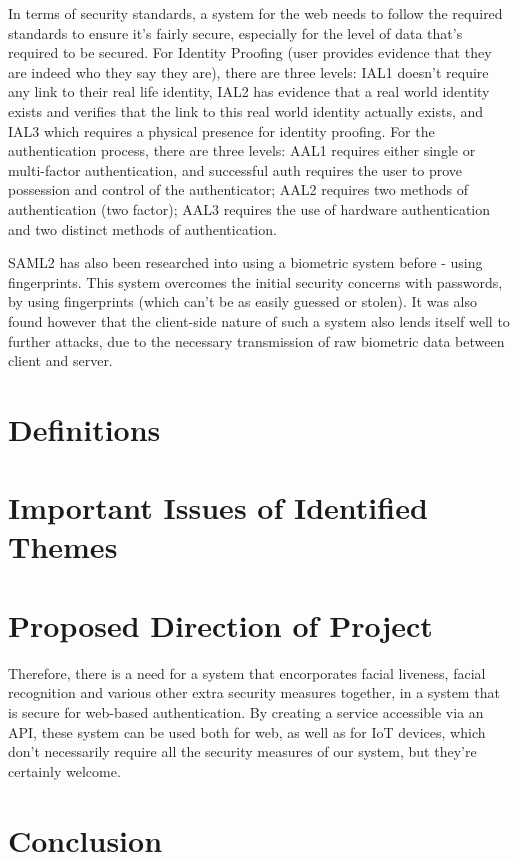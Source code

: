 \documentclass[14pt]{article}
\begin{document}
In terms of security standards, a system for the web needs to follow the required standards to ensure it's fairly secure,
especially for the level of data that's required to be secured. For Identity Proofing (user provides evidence that they are indeed who they say they are),
there are three levels: IAL1 doesn't require any link to their real life identity, IAL2 has evidence that a real world identity exists and verifies that the link to this real world identity actually exists,
and IAL3 which requires a physical presence for identity proofing. For the authentication process, there are three levels: AAL1 requires either single or multi-factor authentication, and successful auth requires
the user to prove possession and control of the authenticator; AAL2 requires two methods of authentication (two factor); AAL3 requires the use of hardware authentication and two distinct methods of authentication.
\cite{NISTDigitalIdentityGuidelines}


SAML2 has also been researched into using a biometric system before - using fingerprints. This system
overcomes the initial security concerns with passwords, by using fingerprints (which can't be as easily guessed or
stolen). It was also found however that the client-side nature of such a system also lends itself well to further attacks,
due to the necessary transmission of raw biometric data between client and server. \cite{SAMLFingerPrint}
\section{Definitions}


\section{Important Issues of Identified Themes}



\section{Proposed Direction of Project}
Therefore, there is a need for a system that encorporates facial liveness, facial recognition and various other
extra security measures together, in a system that is secure for web-based authentication. By creating a service
accessible via an API, these system can be used both for web, as well as for IoT devices, which don't necessarily require
all the security measures of our system, but they're certainly welcome.
\section{Conclusion}
\label{references}
\printbibliography
\end{document}
